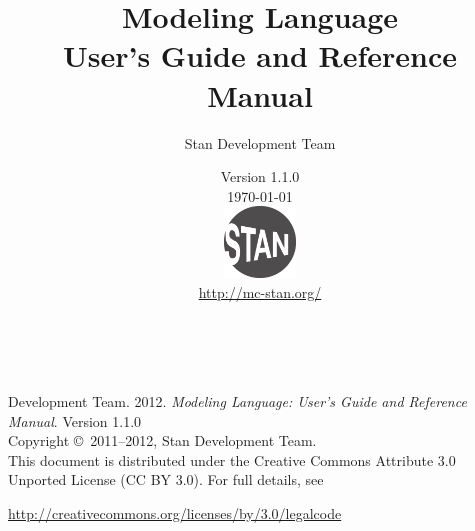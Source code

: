 \title{\Huge\bf \Stan Modeling Language \\[4pt] {\LARGE User's Guide
    and Reference Manual}}
\author{Stan Development Team
}

\date{\vspace*{36pt} \Stan Version 1.1.0 \\[4pt] {\small \today}
\\[36pt]
{
\vfill
\includegraphics[width=0.75in]{../../../logos/stanlogo-main.pdf}}
\\
\vspace*{12pt}
{\small \url{http://mc-stan.org/}}
}
\maketitle

\newpage
\thispagestyle{empty}
\mbox{ }
\vfill
\begin{center}
\begin{minipage}[t]{0.75\textwidth}
\small
\Stan Development Team. 2012.  
{\it \Stan Modeling Language: User's Guide and Reference Manual}. Version
1.1.0
\vspace*{20pt}
\mbox{ }
\\
Copyright \copyright \ 2011--2012, Stan Development Team.
\vspace*{28pt}
\mbox{} \\
This document is distributed under the Creative Commons Attribute 3.0
Unported License (CC BY 3.0).  For full details, see
\begin{center}
\url{http://creativecommons.org/licenses/by/3.0/legalcode} 
\end{center}
\end{minipage}
\vspace*{24pt}
\mbox{ }
\end{center}
